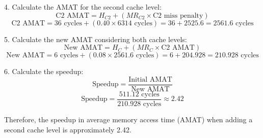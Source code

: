 4. Calculate the AMAT for the second cache level:
\[
\text{C2 AMAT} = H_{C2} + (MR_{C2} \times \text{C2 miss penalty})
\]
\[
\text{C2 AMAT} = 36 \text{ cycles} + (0.40 \times 6314 \text{ cycles}) = 36 + 2525.6 = 2561.6 \text{ cycles}
\]

5. Calculate the new AMAT considering both cache levels:
\[
\text{New AMAT} = H_{C} + (MR_{C} \times \text{C2 AMAT})
\]
\[
\text{New AMAT} = 6 \text{ cycles} + (0.08 \times 2561.6 \text{ cycles}) = 6 + 204.928 = 210.928 \text{ cycles}
\]

6. Calculate the speedup:
\[
\text{Speedup} = \frac{\text{Initial AMAT}}{\text{New AMAT}}
\]
\[
\text{Speedup} = \frac{511.12 \text{ cycles}}{210.928 \text{ cycles}} \approx 2.42
\]


Therefore, the speedup in average memory access time (AMAT) when adding a second cache level is approximately 2.42.
